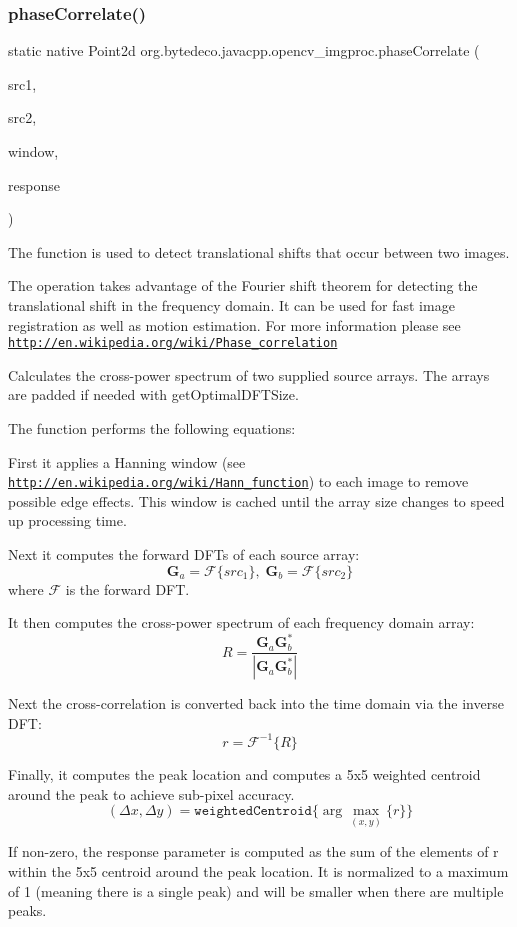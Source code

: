 \subsubsection{\texorpdfstring{phase\+Correlate()}{phaseCorrelate()}}
{\footnotesize\ttfamily static native Point2d org.\+bytedeco.\+javacpp.\+opencv\+\_\+imgproc.\+phase\+Correlate (\begin{DoxyParamCaption}\item[{@By\+Val Mat}]{src1,  }\item[{@By\+Val Mat}]{src2,  }\item[{@By\+Val(null\+Value=\char`\"{}cv\+::\+Input\+Array(cv\+::no\+Array())\char`\"{}) Mat}]{window,  }\item[{Double\+Pointer}]{response }\end{DoxyParamCaption})\hspace{0.3cm}{\ttfamily [static]}}



The function is used to detect translational shifts that occur between two images. 

The operation takes advantage of the Fourier shift theorem for detecting the translational shift in the frequency domain. It can be used for fast image registration as well as motion estimation. For more information please see \href{http://en.wikipedia.org/wiki/Phase_correlation}{\tt http\+://en.\+wikipedia.\+org/wiki/\+Phase\+\_\+correlation} 

Calculates the cross-\/power spectrum of two supplied source arrays. The arrays are padded if needed with get\+Optimal\+D\+F\+T\+Size. 

The function performs the following equations\+:
\begin{DoxyItemize}
\item First it applies a Hanning window (see \href{http://en.wikipedia.org/wiki/Hann_function}{\tt http\+://en.\+wikipedia.\+org/wiki/\+Hann\+\_\+function}) to each image to remove possible edge effects. This window is cached until the array size changes to speed up processing time.
\item Next it computes the forward D\+F\+Ts of each source array\+: \[\mathbf{G}_a = \mathcal{F}\{src_1\}, \; \mathbf{G}_b = \mathcal{F}\{src_2\}\] where $\mathcal{F}$ is the forward D\+FT.
\item It then computes the cross-\/power spectrum of each frequency domain array\+: \[R = \frac{ \mathbf{G}_a \mathbf{G}_b^*}{|\mathbf{G}_a \mathbf{G}_b^*|}\]
\item Next the cross-\/correlation is converted back into the time domain via the inverse D\+FT\+: \[r = \mathcal{F}^{-1}\{R\}\]
\item Finally, it computes the peak location and computes a 5x5 weighted centroid around the peak to achieve sub-\/pixel accuracy. \[(\Delta x, \Delta y) = \texttt{weightedCentroid} \{\arg \max_{(x, y)}\{r\}\}\]
\item If non-\/zero, the response parameter is computed as the sum of the elements of r within the 5x5 centroid around the peak location. It is normalized to a maximum of 1 (meaning there is a single peak) and will be smaller when there are multiple peaks. 
\end{DoxyItemize}


